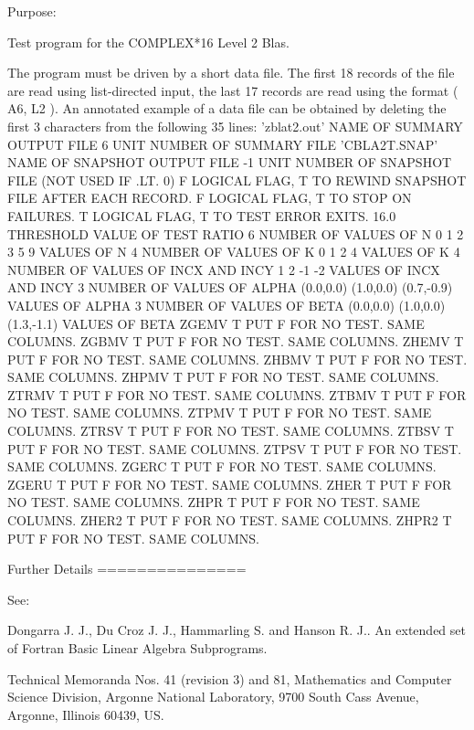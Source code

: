 \begin{DoxyParagraph}{Purpose\+: }
\begin{DoxyVerb} Test program for the COMPLEX*16       Level 2 Blas.

 The program must be driven by a short data file. The first 18 records
 of the file are read using list-directed input, the last 17 records
 are read using the format ( A6, L2 ). An annotated example of a data
 file can be obtained by deleting the first 3 characters from the
 following 35 lines:
 'zblat2.out'      NAME OF SUMMARY OUTPUT FILE
 6                 UNIT NUMBER OF SUMMARY FILE
 'CBLA2T.SNAP'     NAME OF SNAPSHOT OUTPUT FILE
 -1                UNIT NUMBER OF SNAPSHOT FILE (NOT USED IF .LT. 0)
 F        LOGICAL FLAG, T TO REWIND SNAPSHOT FILE AFTER EACH RECORD.
 F        LOGICAL FLAG, T TO STOP ON FAILURES.
 T        LOGICAL FLAG, T TO TEST ERROR EXITS.
 16.0     THRESHOLD VALUE OF TEST RATIO
 6                 NUMBER OF VALUES OF N
 0 1 2 3 5 9       VALUES OF N
 4                 NUMBER OF VALUES OF K
 0 1 2 4           VALUES OF K
 4                 NUMBER OF VALUES OF INCX AND INCY
 1 2 -1 -2         VALUES OF INCX AND INCY
 3                 NUMBER OF VALUES OF ALPHA
 (0.0,0.0) (1.0,0.0) (0.7,-0.9)       VALUES OF ALPHA
 3                 NUMBER OF VALUES OF BETA
 (0.0,0.0) (1.0,0.0) (1.3,-1.1)       VALUES OF BETA
 ZGEMV  T PUT F FOR NO TEST. SAME COLUMNS.
 ZGBMV  T PUT F FOR NO TEST. SAME COLUMNS.
 ZHEMV  T PUT F FOR NO TEST. SAME COLUMNS.
 ZHBMV  T PUT F FOR NO TEST. SAME COLUMNS.
 ZHPMV  T PUT F FOR NO TEST. SAME COLUMNS.
 ZTRMV  T PUT F FOR NO TEST. SAME COLUMNS.
 ZTBMV  T PUT F FOR NO TEST. SAME COLUMNS.
 ZTPMV  T PUT F FOR NO TEST. SAME COLUMNS.
 ZTRSV  T PUT F FOR NO TEST. SAME COLUMNS.
 ZTBSV  T PUT F FOR NO TEST. SAME COLUMNS.
 ZTPSV  T PUT F FOR NO TEST. SAME COLUMNS.
 ZGERC  T PUT F FOR NO TEST. SAME COLUMNS.
 ZGERU  T PUT F FOR NO TEST. SAME COLUMNS.
 ZHER   T PUT F FOR NO TEST. SAME COLUMNS.
 ZHPR   T PUT F FOR NO TEST. SAME COLUMNS.
 ZHER2  T PUT F FOR NO TEST. SAME COLUMNS.
 ZHPR2  T PUT F FOR NO TEST. SAME COLUMNS.

 Further Details
 ===============

    See:

       Dongarra J. J., Du Croz J. J., Hammarling S.  and Hanson R. J..
       An  extended  set of Fortran  Basic Linear Algebra Subprograms.

       Technical  Memoranda  Nos. 41 (revision 3) and 81,  Mathematics
       and  Computer Science  Division,  Argonne  National Laboratory,
       9700 South Cass Avenue, Argonne, Illinois 60439, US.


\end{DoxyVerb}
\end{DoxyParagraph}
